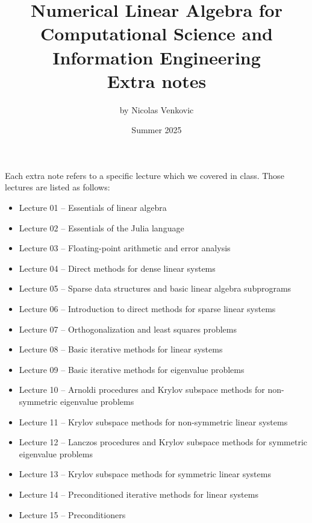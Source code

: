 \documentclass[letterpaper,10pt]{article}
\begin{document}
	
\title{Numerical Linear Algebra for Computational Science and Information Engineering\vspace{.3cm}\\
\large Extra notes}
\author{by Nicolas Venkovic}
\date{Summer 2025}
\maketitle

Each extra note refers to a specific lecture which we covered in class.
Those lectures are listed as follows:
\begin{itemize}
\item[-] Lecture 01 -- Essentials of linear algebra\vspace{-.15cm}
\item[-] Lecture 02 -- Essentials of the Julia language\vspace{-.15cm}
\item[-] Lecture 03 -- Floating-point arithmetic and error analysis\vspace{-.15cm}
\item[-] Lecture 04 -- Direct methods for dense linear systems\vspace{-.15cm}
\item[-] Lecture 05 -- Sparse data structures and basic linear algebra subprograms\vspace{-.15cm}
\item[-] Lecture 06 -- Introduction to direct methods for sparse linear systems\vspace{-.15cm}
\item[-] Lecture 07 -- Orthogonalization and least squares problems\vspace{-.15cm}
\item[-] Lecture 08 -- Basic iterative methods for linear systems\vspace{-.15cm}
\item[-] Lecture 09 -- Basic iterative methods for eigenvalue problems\vspace{-.15cm}
\item[-] Lecture 10 -- Arnoldi procedures and Krylov subspace methods for non-symmetric eigenvalue problems\vspace{-.15cm}
\item[-] Lecture 11 -- Krylov subspace methods for non-symmetric linear systems\vspace{-.15cm}
\item[-] Lecture 12 -- Lanczos procedures and Krylov subspace methods for symmetric eigenvalue problems\vspace{-.15cm}
\item[-] Lecture 13 -- Krylov subspace methods for symmetric linear systems\vspace{-.15cm}
\item[-] Lecture 14 -- Preconditioned iterative methods for linear systems\vspace{-.15cm}
\item[-] Lecture 15 -- Preconditioners\vspace{-.15cm}
\end{itemize}
\end{document}
